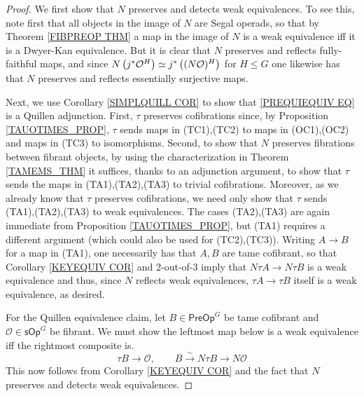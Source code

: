 \documentclass[a4paper,10pt
,draft
]{article}%
\numberwithin{equation}{section}
\numberwithin{figure}{section}
\theoremstyle{definition} %
\renewcommand{\O}{\ensuremath{\mathcal O}}
\newcommand{\1}{\ensuremath{\mathbbm 1}}%
\begin{document}
\begin{proof}
	We first show that $N$ preserves and detects weak equivalences.
	To see this, note first that all objects in the image of $N$ are Segal operads, so that by Theorem \ref{FIBPREOP THM} 
	a map in the image of $N$ is a weak equivalence iff it is a Dwyer-Kan equivalence.
	But it is clear that $N$ preserves and reflects fully-faithful maps,
	and since
	$N \left(j^{\**} \O^H \right)
	\simeq
	j^{\**} \left( (N \O)^H \right)$
	for $H\leq G$
	one likewise has that 
	$N$ preserves and reflects essentially surjective maps.
	
	Next, we use Corollary \ref{SIMPLQUILL COR}
	to show that \eqref{PREQUIEQUIV EQ}
	is a Quillen adjunction.
	First,
	$\tau$ preserves cofibrations since,
	by Proposition \ref{TAUOTIMES_PROP},
	$\tau$ sends maps in (TC1),(TC2) to maps in (OC1),(OC2)
	and maps in (TC3) to isomorphisms.
	Second, to show that $N$ preserves fibrations between fibrant objects,
	by using the characterization in Theorem \ref{TAMEMS_THM}
	it suffices, thanks to an adjunction argument,
	to show that $\tau$
	sends the maps in (TA1),(TA2),(TA3)
	to trivial cofibrations. 
	Moreover, as we already know that $\tau$ preserves cofibrations, we need only show 	that $\tau$
	sends (TA1),(TA2),(TA3)
	to weak equivalences.
	The cases (TA2),(TA3) are again immediate 
	from Proposition \ref{TAUOTIMES_PROP},
	but (TA1) requires a different argument
	(which could also be used for (TC2),(TC3)).
	Writing $A \to B$ for a map in (TA1), one necessarily has that $A,B$ are tame cofibrant, so that
	Corollary \ref{KEYEQUIV COR}
	and $2$-out-of-$3$ imply that 
	$N \tau A \to N \tau B$ is a weak equivalence
	and thus, since $N$ reflects weak equivalences,
	$\tau A \to \tau B$ itself is a weak equivalence,
	as desired.
	
	For the Quillen equivalence claim, 
	let $B \in \mathsf{PreOp}^G$ be tame cofibrant and
	$\mathcal{O} \in \mathsf{sOp}^G$ be fibrant.
	We must show the leftmost map below is a weak equivalence iff 
	the rightmost composite is.
	\[
	\tau B \to \mathcal{O},
	\qquad
	B \xrightarrow{\sim} N \tau B \to N \mathcal{O}
	\]
	This now follows from Corollary \ref{KEYEQUIV COR}
	and the fact that $N$ preserves and detects weak equivalences.
\end{proof}
\end{document}
